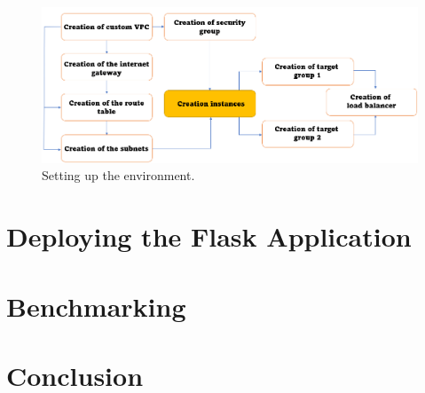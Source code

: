 \documentclass[12pt]{article}
\begin{document}
\begin{figure}[h]
  \includegraphics[width=\linewidth]{Environment_setup.png}
  \caption{Setting up the environment.}
  \label{fig:boat1}
\end{figure}

\section{Deploying the Flask Application}
\section{Benchmarking}
\section{Conclusion}
\end{document}
